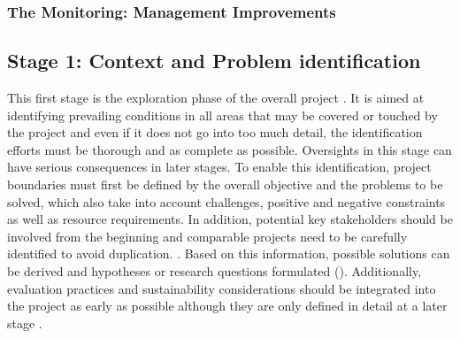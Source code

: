 \subsubsection{The Monitoring: Management Improvements}%




\subsection{Stage 1: Context and Problem identification}
This first stage is the exploration phase of the overall project \autocite{citizenscience.govBasicStepsYour}. It is aimed at identifying prevailing conditions in all areas that may be covered or touched by the project and even if it does not go into too much detail, the identification efforts must be thorough and as complete as possible. Oversights in this stage can have serious consequences in later stages. To enable this identification, project boundaries must first be defined by the overall objective and the problems to be solved, which also take into account challenges, positive and negative constraints as well as resource requirements. In addition, potential key stakeholders should be involved from the beginning and comparable projects need to be carefully identified to avoid duplication. \autocite{citizenscience.govBasicStepsYour,fraislCitizenScienceEnvironmental2022,minkmanCitizenScienceWater2015}. Based on this information, possible solutions can be derived and hypotheses or research questions formulated (\autocite{fraislCitizenScienceEnvironmental2022, silvertownNewDawnCitizen2009}). Additionally, evaluation practices and sustainability considerations should be integrated into the project as early as possible although they are only defined in detail at a later stage \autocite{fraislCitizenScienceEnvironmental2022}.


